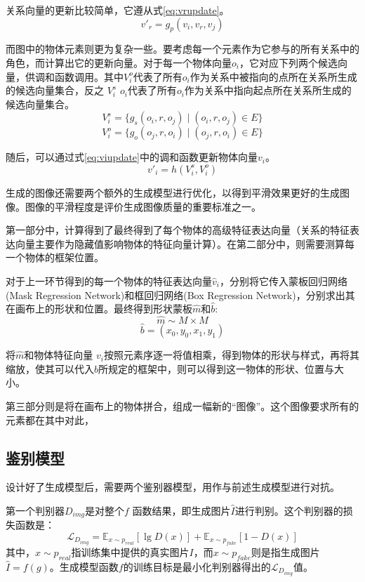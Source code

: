 关系向量的更新比较简单，它遵从式\eqref{eq:vrupdate}。
\begin{equation}
    v'_r = g_p(v_i,v_r,v_j)
    \label{eq:vrupdate}
\end{equation}

而图中的物体元素则更为复杂一些。要考虑每一个元素作为它参与的所有关系中的角色，而计算出它的更新向量。对于每一个物体向量$o_i$，它对应下列两个候选向量，供调和函数调用。其中$V_i^o $代表了所有$o_i$作为关系中被指向的点所在关系所生成的候选向量集合，反之 $V_i^s$ $o_i$代表了所有$o_i$作为关系中指向起点所在关系所生成的候选向量集合。
$$V_i^s = \{g_s(o_i, r, o_j)\mid (o_i, r, o_j)\in E\}$$
$$V_i^o = \{g_o(o_j, r, o_i)\mid (o_j, r, o_i)\in E\}$$

随后，可以通过式\eqref{eq:viupdate}中的调和函数更新物体向量$ v_i $。
\begin{equation}
    v'_i = h(V_i^s, V_i^o)
    \label{eq:viupdate}
\end{equation}

生成的图像还需要两个额外的生成模型进行优化，以得到平滑效果更好的生成图像。图像的平滑程度是评价生成图像质量的重要标准之一。

第一部分中，计算得到了最终得到了每个物体的高级特征表达向量（关系的特征表达向量主要作为隐藏值影响物体的特征向量计算）。在第二部分中，则需要测算每一个物体的框架位置。

对于上一环节得到的每一个物体的特征表达向量$\hat{v}_i$，分别将它传入蒙板回归网络(Mask Regression Network)和框回归网络(Box Regression Network)，分别求出其在画布上的形状和位置。最终得到形状蒙板$\hat{m}$和$\hat{b}$:
$$\hat{m} \sim M \times M$$
$$\hat{b} = (x_0,y_0,x_1,y_1)$$

将$\hat{m} $和物体特征向量 $v_i $按照元素序逐一将值相乘，得到物体的形状与样式，再将其缩放，使其可以代入$\hat{b}$所规定的框架中，则可以得到这一物体的形状、位置与大小。

第三部分则是将在画布上的物体拼合，组成一幅新的“图像”。这个图像要求所有的元素都在其中对此，

\subsection{鉴别模型}
设计好了生成模型后，需要两个鉴别器模型，用作与前述生成模型进行对抗。

第一个判别器$D_{img}$是对整个$f$ 函数结果，即生成图片$\hat{I}$进行判别。这个判别器的损失函数是：
\begin{equation}
    \mathcal{L}_{D_{img}} = \mathbb{E}_{x\sim p_{real}} [\lg D(x)] + \mathbb{E}_{x\sim p_{fake}} [1-D(x)]
    \label{eq:lossdimg}
\end{equation}
其中，$x\sim p_{real}$指训练集中提供的真实图片$I$，而$x\sim p_{fake}$则是指生成图片$\hat{I}=f(g)$。生成模型函数$f$的训练目标是最小化判别器得出的$\mathcal{L}_{D_{img}}$值。

